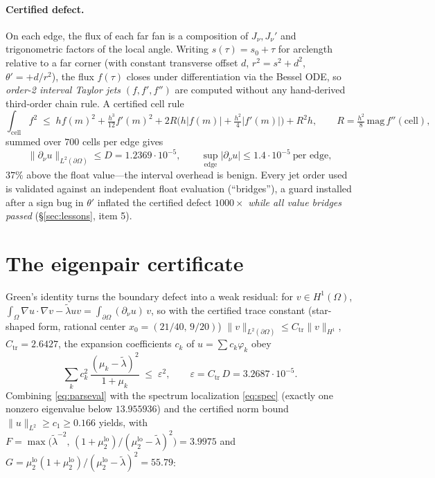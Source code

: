 \documentclass[11pt]{article}
\newcommand{\norm}[1]{\lVert #1 \rVert}
\newcommand{\dnu}{\partial_\nu}
\newcommand{\lam}{\tilde\lambda}
\begin{document}
\paragraph{Certified defect.}
On each edge, the flux of each far fan is a composition of
$J_\nu,J_\nu'$ and trigonometric factors of the local angle. Writing
$s(\tau)=s_0+\tau$ for arclength relative to a far corner (with
constant transverse offset $d$, $r^2=s^2+d^2$, $\theta'=+d/r^2$), the
flux $f(\tau)$ closes under differentiation via the Bessel ODE, so
\emph{order-2 interval Taylor jets} $(f,f',f'')$ are computed without
any hand-derived third-order chain rule. A certified cell rule
\[
\textstyle\int_{\text{cell}} f^2
\;\le\; h f(m)^2 + \tfrac{h^3}{12}f'(m)^2
+ 2R\bigl(h|f(m)|+\tfrac{h^2}{4}|f'(m)|\bigr) + R^2 h,
\qquad R=\tfrac{h^2}{8}\,\mathrm{mag}\,f''(\text{cell}),
\]
summed over $700$ cells per edge gives
\begin{equation}\label{eq:defect}
\norm{\dnu u}_{L^2(\partial\Omega)} \le D = 1.2369\cdot10^{-5},
\qquad \sup_{\text{edge}}|\dnu u| \le 1.4\cdot10^{-5}\ \text{per edge},
\end{equation}
$37\%$ above the float value---the interval overhead is benign. Every
jet order used is validated against an independent float evaluation
(``bridges''), a guard installed after a sign bug in $\theta'$ inflated
the certified defect $1000\times$ \emph{while all value bridges passed}
(\S\ref{sec:lessons}, item 5).

\section{The eigenpair certificate}\label{sec:eigenpair}

Green's identity turns the boundary defect into a weak residual: for
$v\in H^1(\Omega)$,
$\int_\Omega \nabla u\cdot\nabla v - \lam u v = \int_{\partial\Omega}(\dnu u)\,v$,
so with the certified trace constant (star-shaped form, rational center
$x_0=(21/40,\,9/20)$)
$\norm{v}_{L^2(\partial\Omega)}\le C_{\mathrm{tr}}\norm{v}_{H^1}$,
$C_{\mathrm{tr}}=2.6427$, the expansion coefficients $c_k$ of
$u=\sum c_k\varphi_k$ obey
\begin{equation}\label{eq:parseval}
\sum_k c_k^2\,\frac{(\mu_k-\lam)^2}{1+\mu_k} \;\le\; \varepsilon^2,
\qquad \varepsilon = C_{\mathrm{tr}}\,D = 3.2687\cdot10^{-5}.
\end{equation}
Combining \eqref{eq:parseval} with the spectrum localization
\eqref{eq:spec} (exactly one nonzero eigenvalue below $13.955936$) and
the certified norm bound $\norm{u}_{L^2}\ge c_1 \ge 0.166$ yields, with
$F=\max\bigl(\lam^{-2},\,(1+\mu_2^{\mathrm{lo}})/(\mu_2^{\mathrm{lo}}-\lam)^2\bigr)=3.9975$
and $G=\mu_2^{\mathrm{lo}}(1+\mu_2^{\mathrm{lo}})/(\mu_2^{\mathrm{lo}}-\lam)^2=55.79$:
\end{document}
